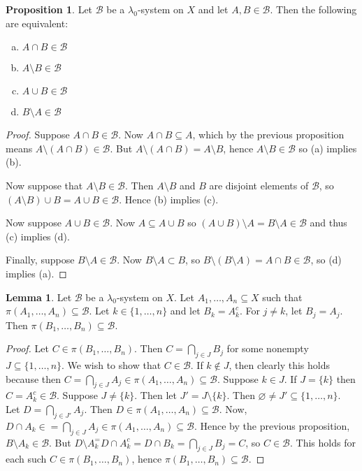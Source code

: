 \documentclass{article}
\theoremstyle{definition}
\newtheorem{lemma}[theorem]{Lemma}
\newtheorem{proposition}[theorem]{Proposition}
\begin{document}
\begin{proposition}
    Let $\mathscr{B}$ be a $\lambda_0$-system on $X$ and let $A, B \in \mathscr{B}$. Then the following are equivalent:
    \begin{enumerate}[(a)]
        \item $A \cap B \in \mathscr{B}$
        \item $A \setminus B \in \mathscr{B}$
        \item $A \cup B \in \mathscr{B}$
        \item $B \setminus A \in \mathscr{B}$
    \end{enumerate}
\end{proposition}
\begin{proof}
    Suppose $A \cap B \in \mathscr{B}$. Now $A \cap B \subseteq A$, which by the previous proposition means $A \setminus (A \cap B) \in \mathscr{B}$. But $A \setminus (A \cap B) = A \setminus B$, hence $A \setminus B \in \mathscr{B}$ so (a) implies (b).
    
    Now suppose that $A \setminus B \in \mathscr{B}$. Then $A \setminus B$ and $B$ are disjoint elements of $\mathscr{B}$, so $(A \setminus B) \cup B = A \cup B \in \mathscr{B}$. Hence (b) implies (c).
    
    Now suppose $A \cup B \in \mathscr{B}$. Now $A \subseteq A \cup B$ so $(A \cup B) \setminus A = B \setminus A \in \mathscr{B}$ and thus (c) implies (d).
    
    Finally, suppose $B \setminus A \in \mathscr{B}$. Now $B \setminus A \subset B$, so $B \setminus (B \setminus A) = A \cap B \in \mathscr{B}$, so (d) implies (a).
\end{proof}

\begin{lemma}
Let $\mathscr{B}$ be a $\lambda_0$-system on $X$. Let $A_1, \ldots, A_n \subseteq X$ such that $\pi(A_1, \ldots, A_n) \subseteq \mathscr{B}$. Let $k \in \{1, \ldots, n\}$ and let $B_k = A_k^c$. For $j \neq k$, let $B_j = A_j$. Then $\pi(B_1, \ldots, B_n) \subseteq \mathscr{B}$.
\end{lemma}
\begin{proof}
    Let $C \in \pi(B_1, \ldots, B_n)$. Then $C = \bigcap_{j \in J} B_j$ for some nonempty $J \subseteq \{1, \ldots, n\}$. We wish to show that $C \in \mathscr{B}$.
    If $k \notin J$, then clearly this holds because then $C = \bigcap_{j \in J} A_j \in \pi(A_1, \ldots, A_n) \subseteq \mathscr{B}$. Suppose $k \in J$. If $J = \{k\}$ then $C = A_k^c \in \mathscr{B}$.
    Suppose $J \neq \{k\}$. Then let $J' = J \setminus\{k\}$. Then $\varnothing \neq J' \subseteq \{1, \ldots, n\}$.
    Let $D = \bigcap_{j \in J'} A_j$. Then $D \in \pi(A_1, \ldots, A_n) \subseteq \mathscr{B}$.
    Now, $D \cap A_k \in = \bigcap_{j \in J} A_j \in \pi(A_1, \ldots, A_n) \subseteq \mathscr{B}$. Hence by the previous proposition, $B \setminus A_k \in \mathscr{B}$.
    But $D \setminus A_k^ = D \cap A_k^c = D \cap B_k = \bigcap_{j \in J} B_j = C$, so $C \in \mathscr{B}$.
    This holds for each such $C \in \pi(B_1, \ldots, B_n)$, hence $\pi(B_1, \ldots, B_n) \subseteq \mathscr{B}$.
\end{proof}
\end{document}
